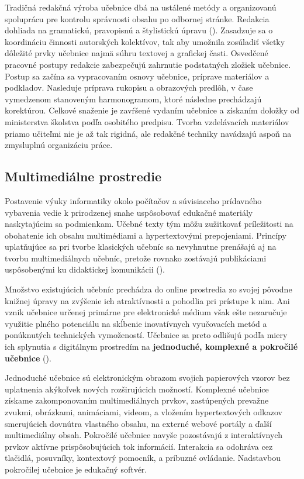 Tradičná redakčná výroba učebnice dbá na ustálené metódy a organizovanú spoluprácu pre kontrolu správnosti obsahu po odbornej stránke. Redakcia dohliada na gramatickú, pravopisnú a štylistickú úpravu (\cite{mlady_tvorba_1988}). Zasadzuje sa o koordináciu činnosti autorských kolektívov, tak aby umožnila zosúladiť všetky dôležité prvky učebnice najmä súhru textovej a grafickej časti. Osvedčené pracovné postupy redakcie zabezpečujú zahrnutie podstatných zložiek učebnice. Postup sa začína sa vypracovaním osnovy učebnice, príprave materiálov a podkladov. Nasleduje príprava rukopisu a obrazových predlôh, v čase vymedzenom stanoveným harmonogramom, ktoré následne prechádzajú korektúrou. Celkové snaženie je zavŕšené vydaním učebnice a získaním doložky od ministerstva školstva podľa osobitého predpisu. Tvorba vzdelávacích materiálov priamo učiteľmi nie je až tak rigidná, ale redakčné techniky navádzajú aspoň na zmysluplnú organizáciu práce.

\subsection{Multimediálne prostredie}
Postavenie výuky informatiky okolo počítačov a súvisiaceho prídavného vybavenia vedie k prirodzenej snahe uspôsobovať edukačné materiály naskytajúcim sa podmienkam. Učebné texty tým môžu zužitkovať príležitosti na obohatenie ich obsahu multimédiami a hypertextovými prepojeniami. Princípy uplatňujúce sa pri tvorbe klasických učebníc sa nevyhnutne prenášajú aj na tvorbu multimediálnych učebníc, pretože rovnako zostávajú publikáciami uspôsobenými ku didaktickej komunikácii (\cite{krotky_nove_2015}).

Množstvo existujúcich učebníc prechádza do online prostredia zo svojej pôvodne knižnej úpravy na zvýšenie ich atraktívnosti a pohodlia pri prístupe k nim. Ani vznik učebnice určenej primárne pre elektronické médium však ešte nezaručuje využitie plného potenciálu na skĺbenie inovatívnych vyučovacích metód a ponúknutých technických vymožeností. Učebnice sa preto odlišujú podľa miery ich splynutia s digitálnym prostredím na \textbf{jednoduché, komplexné a pokročilé učebnice} (\cite{krotky_nove_2015}).

Jednoduché učebnice sú elektronickým obrazom svojich papierových vzorov bez uplatnenia akýkoľvek nových rozširujúcich možností. Komplexné učebnice získame zakomponovaním multimediálnych prvkov, zastúpených prevažne zvukmi, obrázkami, animáciami, videom, a vložením  hypertextových odkazov smerujúcich dovnútra vlastného obsahu, na externé webové portály a ďalší multimediálny obsah. Pokročilé učebnice navyše pozostávajú z interaktívnych prvkov aktívne prispôsobujúcich tok informácií. Interakcia sa odohráva cez tlačidlá, posuvníky, kontextový pomocník, a príbuzné ovládanie. Nadstavbou pokročilej učebnice je edukačný softvér.

